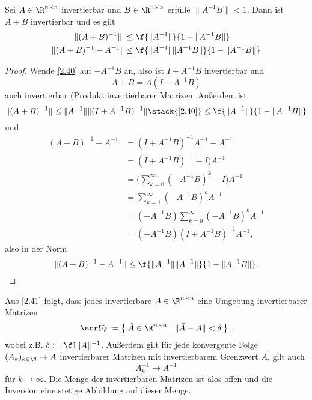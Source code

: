 \begin{lem} \label{2.41}
	Sei $A \in \R^{n\times n}$ invertierbar und $B \in \R^{n\times n}$ erfülle $\|A^{-1} B\| < 1$.
	Dann ist $A + B$ invertierbar und es gilt
	\begin{align*}
		\|(A + B)^{-1}\|\
		&\le \f {\|A^{-1}\|}{1-\|A^{-1}B\|} \\
		\|(A+B)^{-1} - A^{-1}\|
		&\le \f {\|A^{-1}\|\|A^{-1}B\|}{1-\|A^{-1}B\|}
	\end{align*}
	\begin{proof}
		Wende \ref{2.40} auf $-A^{-1}B$ an, also ist $I + A^{-1}B$ invertierbar und
		\[
			A + B
			= A(I + A^{-1}B)
		\]
		auch invertierbar (Produkt invertierbarer Matrizen.
		Außerdem ist
		\[
			\|(A+B)^{-1}\|
			\le \|A^{-1}\| \|(I+A^{-1}B)^{-1}\|
			\stack{\ref{2.40}}\le \f {\|A^{-1}\|}{1-\|A^{-1}B\|}
		\]
		und
		\begin{align*}
			(A+B)^{-1} - A^{-1}
			&= (I + A^{-1}B)^{-1}A^{-1} - A^{-1} \\
			&= (I + A^{-1}B)^{-1} - I) A^{-1} \\
			&= \bigg(\sum_{k=0}^\infty (-A^{-1}B)^k - I\bigg) A^{-1} \\
			&= \sum_{k=1}^\infty (-A^{-1}B)^k A^{-1} \\
			&= (-A^{-1}B) \sum_{k=0}^\infty (-A^{-1}B)^k A^{-1} \\
			&= (-A^{-1}B) (I + A^{-1}B)^{-1} A^{-1},
		\end{align*}
		also in der Norm
		\[
			\|(A+B)^{-1} - A^{-1}\|
			\le \f {\|A^{-1}\| \|A^{-1}\|}{1-\|A^{-1}B\|}.
		\]
	\end{proof}
\end{lem}

\begin{kor} \label{2.42}
	Aus \ref{2.41} folgt, dass jedes invertierbare $A \in \R^{n\times n}$ eine Umgebung invertierbarer Matrizen
	\[
		\scr U_\delta
		:= \Set{ \tilde A \in \R^{n\times n} | \|\tilde A - A\| < \delta },
	\]
	wobei z.B. $\delta := \f 1{\|A\|^{-1}}$.
	Außerdem gilt für jede konvergente Folge $(A_k)_{k\in\N} \to A$ invertierbarer Matrizen mit invertierbarem Grenzwert $A$, gilt auch
	\[
		A_k^{-1} \to A^{-1}
	\]
	für $k \to \infty$.
	Die Menge der invertierbaren Matrizen ist alos offen und die Inversion eine stetige Abbildung auf dieser Menge.
\end{kor}

